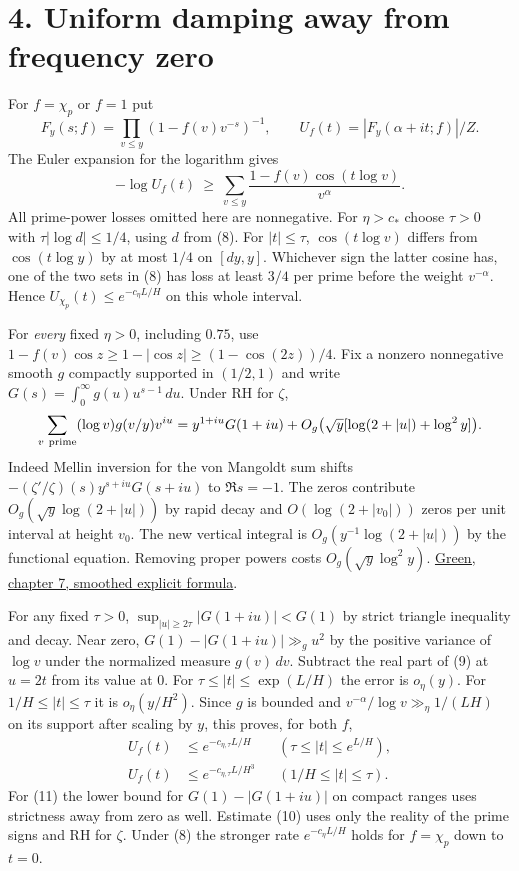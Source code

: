 \documentclass[11pt]{article}
\newcommand{\ch}{\chi_p}
\begin{document}
\newpage
\section*{4. Uniform damping away from frequency zero}
For \(f=\ch\) or \(f=1\) put
\[
 F_y(s;f)=\prod_{v\le y}(1-f(v)v^{-s})^{-1},\qquad
 U_f(t)=|F_y(\alpha+it;f)|/Z .
\]
The Euler expansion for the logarithm gives
\[
 -\log U_f(t)\ \ge\ \sum_{v\le y}
       \frac{1-f(v)\cos(t\log v)}{v^\alpha}.
\]
All prime-power losses omitted here are nonnegative. For \(\eta>c_*\)
choose \(\tau>0\) with \(\tau|\log d|\le1/4\), using \(d\) from (8).
For \(|t|\le\tau\), \(\cos(t\log v)\) differs from \(\cos(t\log y)\)
by at most \(1/4\) on \([dy,y]\). Whichever sign the latter cosine has,
one of the two sets in (8) has loss at least \(3/4\) per prime before
the weight \(v^{-\alpha}\). Hence \(U_{\ch}(t)\le e^{-c_\eta L/H}\)
on this whole interval.

For \emph{every} fixed \(\eta>0\), including \(0.75\), use
\(1-f(v)\cos z\ge 1-|\cos z|\ge(1-\cos(2z))/4\).
Fix a nonzero nonnegative smooth \(g\) compactly supported in \((1/2,1)\)
and write \(G(s)=\int_0^\infty g(u)u^{s-1}\,du\). Under RH for \(\zeta\),
\begin{equation}
 \sum_{v\ {\rm prime}}(\log v)g(v/y)v^{iu}
 =y^{1+iu}G(1+iu)+O_g\big(\sqrt y[\log(2+|u|)+\log^2 y]\big).
 \label{eq:twist}
\end{equation}
Indeed Mellin inversion for the von Mangoldt sum shifts
\(-(\zeta'/\zeta)(s)y^{s+iu}G(s+iu)\) to \(\Re s=-1\).
The zeros contribute \(O_g(\sqrt y\log(2+|u|))\) by rapid decay and
\(O(\log(2+|v_0|))\) zeros per unit interval at height \(v_0\).
The new vertical integral is \(O_g(y^{-1}\log(2+|u|))\) by the functional
equation. Removing proper powers costs \(O_g(\sqrt y\log^2 y)\).
\href{https://people.maths.ox.ac.uk/greenbj/papers/primenumbers.pdf}{Green, chapter 7, smoothed explicit formula}.

For any fixed \(\tau>0\),
\(\sup_{|u|\ge2\tau}|G(1+iu)|<G(1)\) by strict triangle inequality
and decay. Near zero, \(G(1)-|G(1+iu)|\gg_g u^2\) by the positive
variance of \(\log v\) under the normalized measure \(g(v)\,dv\).
Subtract the real part of (9) at \(u=2t\) from its value at \(0\).
For \(\tau\le |t|\le\exp(L/H)\) the error is \(o_\eta(y)\).
For \(1/H\le|t|\le\tau\) it is \(o_\eta(y/H^2)\).
Since \(g\) is bounded and \(v^{-\alpha}/\log v\gg_\eta 1/(LH)\)
on its support after scaling by \(y\), this proves, for both \(f\),
\begin{align}
 U_f(t)&\le e^{-c_{\eta,\tau}L/H}
           &&(\tau\le |t|\le e^{L/H}),\label{eq:high}\\
 U_f(t)&\le e^{-c_{\eta,\tau}L/H^3}
           &&(1/H\le |t|\le\tau).\label{eq:middle}
\end{align}
For (11) the lower bound for \(G(1)-|G(1+iu)|\) on compact ranges uses
strictness away from zero as well. Estimate (10) uses only the reality
of the prime signs and RH for \(\zeta\). Under (8) the stronger rate
\(e^{-c_\eta L/H}\) holds for \(f=\ch\) down to \(t=0\).
\end{document}
